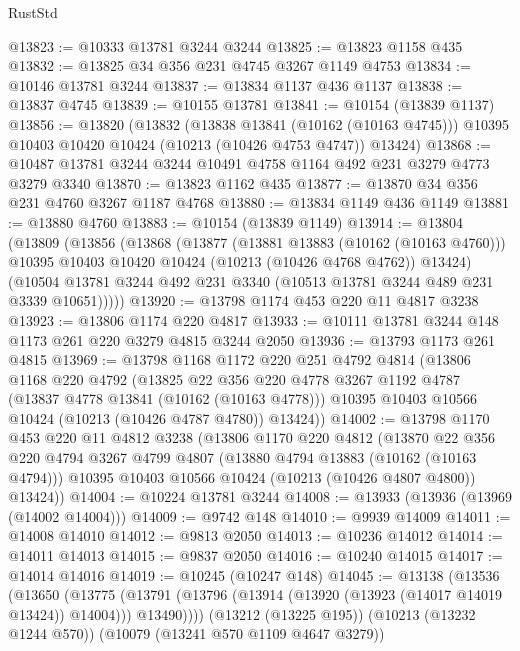 \begin{lexlean}{RustStd}
\begin{coremodule}
@13823 := @10333 @13781 @3244 @3244
@13825 := @13823 @1158 @435
@13832 := @13825 @34 @356 @231 @4745 @3267 @1149 @4753
@13834 := @10146 @13781 @3244
@13837 := @13834 @1137 @436 @1137
@13838 := @13837 @4745
@13839 := @10155 @13781
@13841 := @10154 (@13839 @1137)
@13856 := @13820
    (@13832
      (@13838 @13841 (@10162 (@10163 @4745)))
      @10395
      @10403
      @10420
      @10424
      (@10213 (@10426 @4753 @4747))
      @13424)
@13868 := @10487 @13781 @3244 @3244 @10491 @4758 @1164 @492 @231 @3279 @4773 @3279 @3340
@13870 := @13823 @1162 @435
@13877 := @13870 @34 @356 @231 @4760 @3267 @1187 @4768
@13880 := @13834 @1149 @436 @1149
@13881 := @13880 @4760
@13883 := @10154 (@13839 @1149)
@13914 := @13804
    (@13809
      (@13856
        (@13868
          (@13877
            (@13881 @13883 (@10162 (@10163 @4760)))
            @10395
            @10403
            @10420
            @10424
            (@10213 (@10426 @4768 @4762))
            @13424)
          (@10504 @13781 @3244 @492 @231 @3340 (@10513 @13781 @3244 @489 @231 @3339 @10651)))))
@13920 := @13798 @1174 @453 @220 @11 @4817 @3238
@13923 := @13806 @1174 @220 @4817
@13933 := @10111 @13781 @3244 @148 @1173 @261 @220 @3279 @4815 @3244 @2050
@13936 := @13793 @1173 @261 @4815
@13969 := @13798
    @1168
    @1172
    @220
    @251
    @4792
    @4814
    (@13806
      @1168
      @220
      @4792
      (@13825
        @22
        @356
        @220
        @4778
        @3267
        @1192
        @4787
        (@13837 @4778 @13841 (@10162 (@10163 @4778)))
        @10395
        @10403
        @10566
        @10424
        (@10213 (@10426 @4787 @4780))
        @13424))
@14002 := @13798
    @1170
    @453
    @220
    @11
    @4812
    @3238
    (@13806
      @1170
      @220
      @4812
      (@13870
        @22
        @356
        @220
        @4794
        @3267
        @4799
        @4807
        (@13880 @4794 @13883 (@10162 (@10163 @4794)))
        @10395
        @10403
        @10566
        @10424
        (@10213 (@10426 @4807 @4800))
        @13424))
@14004 := @10224 @13781 @3244
@14008 := @13933 (@13936 (@13969 (@14002 @14004)))
@14009 := @9742 @148
@14010 := @9939 @14009
@14011 := @14008 @14010
@14012 := @9813 @2050
@14013 := @10236 @14012
@14014 := @14011 @14013
@14015 := @9837 @2050
@14016 := @10240 @14015
@14017 := @14014 @14016
@14019 := @10245 (@10247 @148)
@14045 := @13138
    (@13536
      (@13650
        (@13775 (@13791 (@13796 (@13914 (@13920 (@13923 (@14017 @14019 @13424)) @14004))) @13490))))
    (@13212 (@13225 @195))
    (@10213 (@13232 @1244 @570))
    (@10079 (@13241 @570 @1109 @4647 @3279))

\end{coremodule}
\end{lexlean}
